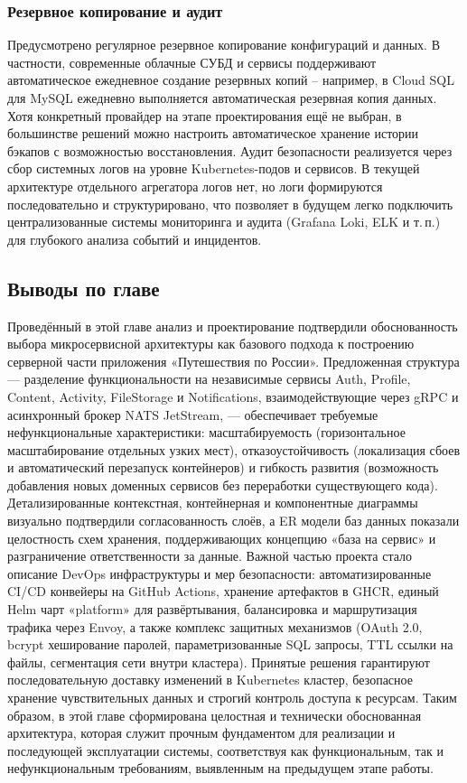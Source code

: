 \subsubsection*{Резервное копирование и аудит}
Предусмотрено регулярное резервное копирование конфигураций и данных. В частности, современные облачные СУБД и сервисы поддерживают автоматическое ежедневное создание резервных копий – например, в Cloud SQL для MySQL ежедневно выполняется автоматическая резервная копия данных. Хотя конкретный провайдер на этапе проектирования ещё не выбран, в большинстве решений можно настроить автоматическое хранение истории бэкапов с возможностью восстановления. Аудит безопасности реализуется через сбор системных логов на уровне Kubernetes-подов и сервисов. В текущей архитектуре отдельного агрегатора логов нет, но логи формируются последовательно и структурировано, что позволяет в будущем легко подключить централизованные системы мониторинга и аудита (Grafana Loki, ELK и т. п.) для глубокого анализа событий и инцидентов.

\subsection*{Выводы по главе}

Проведённый в этой главе анализ и проектирование подтвердили обоснованность выбора микросервисной архитектуры как базового подхода к построению серверной части приложения «Путешествия по России». Предложенная структура — разделение функциональности на независимые сервисы Auth, Profile, Content, Activity, FileStorage и Notifications, взаимодействующие через gRPC и асинхронный брокер NATS JetStream, — обеспечивает требуемые нефункциональные характеристики: масштабируемость (горизонтальное масштабирование отдельных узких мест), отказоустойчивость (локализация сбоев и автоматический перезапуск контейнеров) и гибкость развития (возможность добавления новых доменных сервисов без переработки существующего кода). Детализированные контекстная, контейнерная и компонентные диаграммы визуально подтвердили согласованность слоёв, а ER модели баз данных показали целостность схем хранения, поддерживающих концепцию «база на сервис» и разграничение ответственности за данные.
Важной частью проекта стало описание DevOps инфраструктуры и мер безопасности: автоматизированные CI/CD конвейеры на GitHub Actions, хранение артефактов в GHCR, единый Helm чарт «platform» для развёртывания, балансировка и маршрутизация трафика через Envoy, а также комплекс защитных механизмов (OAuth 2.0, bcrypt хеширование паролей, параметризованные SQL запросы, TTL ссылки на файлы, сегментация сети внутри кластера). Принятые решения гарантируют последовательную доставку изменений в Kubernetes кластер, безопасное хранение чувствительных данных и строгий контроль доступа к ресурсам. Таким образом, в этой главе сформирована целостная и технически обоснованная архитектура, которая служит прочным фундаментом для реализации и последующей эксплуатации системы, соответствуя как функциональным, так и нефункциональным требованиям, выявленным на предыдущем этапе работы.

